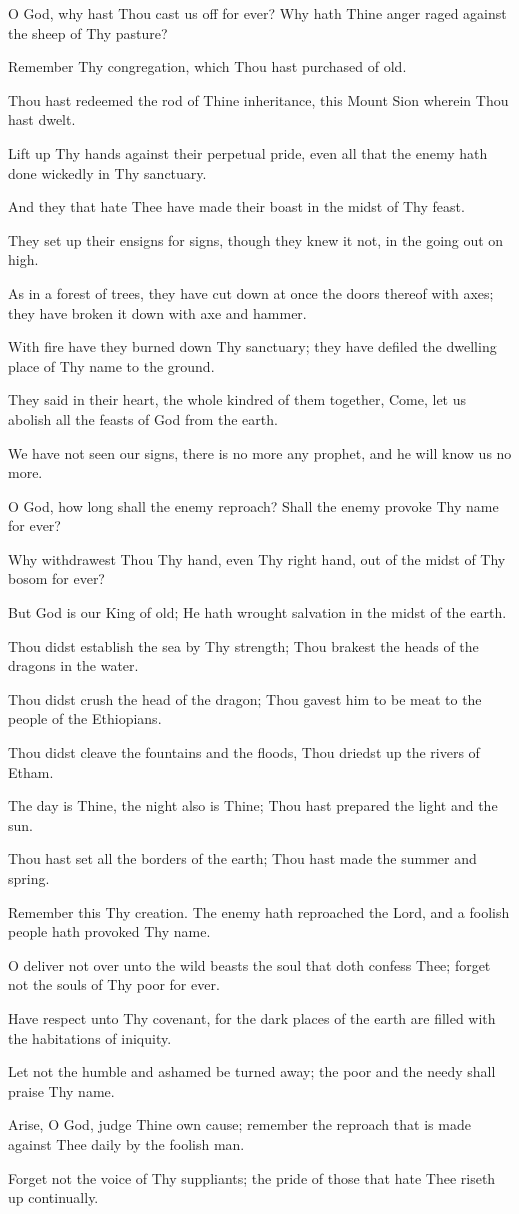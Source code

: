 O God, why hast Thou cast us off for ever? Why hath Thine anger raged against the sheep of Thy pasture?

Remember Thy congregation, which Thou hast purchased of old.

Thou hast redeemed the rod of Thine inheritance, this Mount Sion wherein Thou hast dwelt.

Lift up Thy hands against their perpetual pride, even all that the enemy hath done wickedly in Thy sanctuary.

And they that hate Thee have made their boast in the midst of Thy feast.

They set up their ensigns for signs, though they knew it not, in the going out on high.

As in a forest of trees, they have cut down at once the doors thereof with axes; they have broken it down with axe and hammer.

With fire have they burned down Thy sanctuary; they have defiled the dwelling place of Thy name to the ground.

They said in their heart, the whole kindred of them together, Come, let us abolish all the feasts of God from the earth.

We have not seen our signs, there is no more any prophet, and he will know us no more.

O God, how long shall the enemy reproach? Shall the enemy provoke Thy name for ever?

Why withdrawest Thou Thy hand, even Thy right hand, out of the midst of Thy bosom for ever?

But God is our King of old; He hath wrought salvation in the midst of the earth.

Thou didst establish the sea by Thy strength; Thou brakest the heads of the dragons in the water.

Thou didst crush the head of the dragon; Thou gavest him to be meat to the people of the Ethiopians.

Thou didst cleave the fountains and the floods, Thou driedst up the rivers of Etham.

The day is Thine, the night also is Thine; Thou hast prepared the light and the sun.

Thou hast set all the borders of the earth; Thou hast made the summer and spring.

Remember this Thy creation. The enemy hath reproached the Lord, and a foolish people hath provoked Thy name.

O deliver not over unto the wild beasts the soul that doth confess Thee; forget not the souls of Thy poor for ever.

Have respect unto Thy covenant, for the dark places of the earth are filled with the habitations of iniquity.

Let not the humble and ashamed be turned away; the poor and the needy shall praise Thy name.

Arise, O God, judge Thine own cause; remember the reproach that is made against Thee daily by the foolish man.

Forget not the voice of Thy suppliants; the pride of those that hate Thee riseth up continually.
